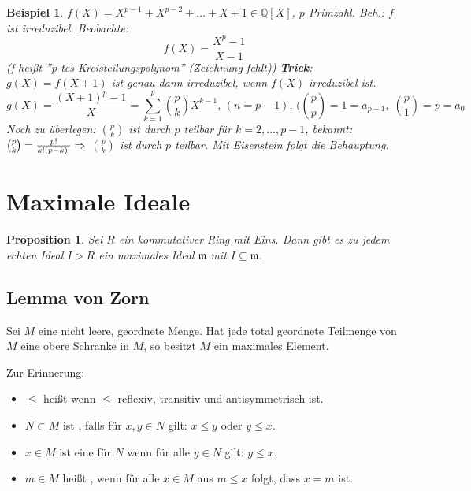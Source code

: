 \documentclass[a4paper,10pt,german]{scrbook}
\theoremstyle{saetze}
\theoremstyle{definitionen}
\newtheorem{Prop}[Def]{Proposition}
\newtheorem{Bsp}[Def]{Beispiel}
\begin{document}
\begin{Bsp}
\label{Bsp 2.27}
$f(X) = X^{p-1} + X ^{p-2} + \dots + X + 1
\in \mathbb{Q}[X]$, $p$ Primzahl. Beh.: $f$ ist irreduzibel.
\newline Beobachte: \[f(X) = \frac{X^p - 1}{X - 1}\] (f heißt ''p-tes
Kreisteilungspolynom'' (Zeichnung fehlt))
\newline \textbf{Trick}: $g(X) = f(X + 1)$ ist genau dann
irreduzibel, wenn $f(X)$ irreduzibel ist. \[g(X) = \frac{(X+1)^p -
1}{X} = \sum_{k=1}^p \binom{p}{k} X^{k-1}\mbox{, }(n=p-1)\mbox{, }(\binom{p}{p} = 1 =
a_{p-1},\;\binom{p}{1} = p = a_0\] Noch zu überlegen: $\binom{p}{k}$
ist durch $p$ teilbar für $k=2,\dots,p-1$, bekannt: $\binom{p}{k} =
\frac{p!}{k!(p-k)!} \Rightarrow$ $\binom{p}{k}$ ist durch $p$ teilbar. Mit
Eisenstein folgt die Behauptung.
\end{Bsp}

\section{Maximale Ideale}

\begin{Prop}
Sei $R$ ein kommutativer Ring mit Eins. Dann gibt es zu jedem echten Ideal $I\triangleright R$ ein maximales Ideal $\mathfrak m$ mit $I\subseteq \mathfrak m$.
\end{Prop}

\subsection*{Lemma von Zorn}

Sei $M$ eine nicht leere, geordnete Menge. Hat jede total geordnete Teilmenge von $M$ eine obere Schranke in $M$, so besitzt $M$ ein maximales Element.

Zur Erinnerung:
\begin{itemize}
\item $\le$ heißt  wenn $\le$ reflexiv, transitiv und antisymmetrisch ist.
\item $N\subset M$ ist , falls für $x,y\in N$ gilt: $x\le y$ oder $y\le x$.
\item $x\in M$ ist eine  für $N$ wenn für alle $y\in N$ gilt: $y\le x$.
\item $m\in M$ heißt , wenn für alle $x\in M$ aus $m\le x$ folgt, dass $x=m$ ist.
\end{itemize}

\end{document}
